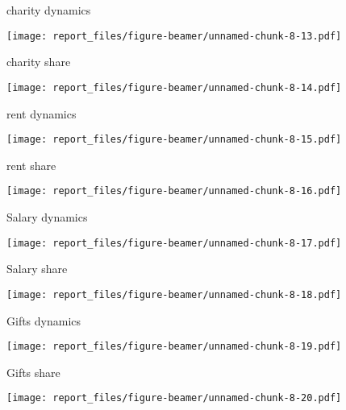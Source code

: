 \documentclass[ignorenonframetext,]{beamer}
\begin{document}
\begin{frame}{charity dynamics}
\protect\hypertarget{charity-dynamics}{}

\texttt{[image: report\_files/figure-beamer/unnamed-chunk-8-13.pdf]}

\end{frame}

\begin{frame}{charity share}
\protect\hypertarget{charity-share}{}

\texttt{[image: report\_files/figure-beamer/unnamed-chunk-8-14.pdf]}

\end{frame}

\begin{frame}{rent dynamics}
\protect\hypertarget{rent-dynamics}{}

\texttt{[image: report\_files/figure-beamer/unnamed-chunk-8-15.pdf]}

\end{frame}

\begin{frame}{rent share}
\protect\hypertarget{rent-share}{}

\texttt{[image: report\_files/figure-beamer/unnamed-chunk-8-16.pdf]}

\end{frame}

\begin{frame}{Salary dynamics}
\protect\hypertarget{salary-dynamics}{}

\texttt{[image: report\_files/figure-beamer/unnamed-chunk-8-17.pdf]}

\end{frame}

\begin{frame}{Salary share}
\protect\hypertarget{salary-share}{}

\texttt{[image: report\_files/figure-beamer/unnamed-chunk-8-18.pdf]}

\end{frame}

\begin{frame}{Gifts dynamics}
\protect\hypertarget{gifts-dynamics}{}

\texttt{[image: report\_files/figure-beamer/unnamed-chunk-8-19.pdf]}

\end{frame}

\begin{frame}{Gifts share}
\protect\hypertarget{gifts-share}{}

\texttt{[image: report\_files/figure-beamer/unnamed-chunk-8-20.pdf]}

\end{frame}
\end{document}
